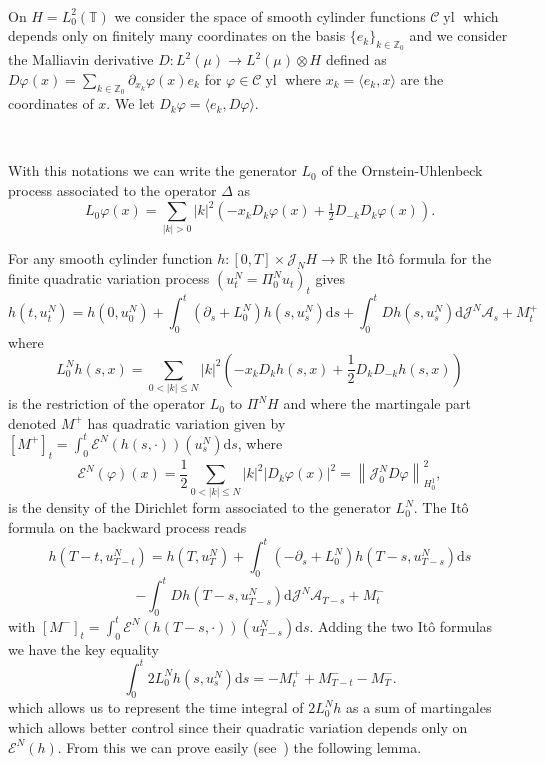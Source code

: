\documentclass[a4paper,11pt]{article}
\newcommand{\mathd}{\mathrm{d}}
\newcommand{\tmop}[1]{\ensuremath{\operatorname{#1}}}
\newcommand{\cyl}{\mathcal{C} \tmop{yl}}
\newcommand{\JJ}{\mathcal{J}}
\begin{document}
\

On $H = L^2_0 (\mathbb{T})$ we consider the space of smooth cylinder
functions $\cyl$ which depends only on finitely many coordinates on the basis
$\{e_k \}_{k \in \mathbb{Z}_0}$ and we consider the Malliavin derivative $D :
L^2 (\mu) \to L^2 (\mu) \otimes H$ defined as $D \varphi (x) = \sum_{k \in
\mathbb{Z}_0} \partial_{x_k} \varphi (x) e_k$ for $\varphi \in \cyl$ where
$x_k = \langle e_k, x \rangle$ are the coordinates of $x$. We let $D_k \varphi
= \langle e_k, D \varphi \rangle$.

\

With this notations we can write the generator $L_0$ of the
Ornstein-Uhlenbeck process associated to the operator $\Delta$ as
\begin{equation}
  \label{eq:generator-ou} L_0 \varphi (x) = \sum_{| k | > 0} |k|^2  \left( -
  x_k D_k \varphi (x) + \tfrac{1}{2} D_{- k} D_k \varphi (x) \right) .
\end{equation}


For any smooth cylinder function $h : [0, T] \times \JJ_N H \to \mathbb{R}$
the It{\^o} formula for the finite quadratic variation process $(u^N_t =
\Pi^N_0 u_t)_t$ gives
\[ h (t, u^N_t) = h (0, u^N_0) + \int_0^t (\partial_s + L^N_0) h (s, u^N_s)
   \mathd s + \int_0^t Dh (s, u^N_s) \mathd \JJ^N \mathcal{A}_s + M^+_t \]
where
\[ L^N_0 h (s, x) = \sum_{0 < |k| \le N} |k|^2  (- x_k D_k h (s, x) +
   \frac{1}{2} D_k D_{- k} h (s, x)) \]
is the restriction of the operator $L_0$ to $\Pi^N H$ and where the martingale
part denoted $M^+$ has quadratic variation given by $[M^+]_t = \int_0^t
\mathcal{E}^N (h (s, \cdot)) (u^N_s) \mathd s$, where
\[ \mathcal{E}^N (\varphi) (x) = \frac{1}{2}  \sum_{0 < |k| \le N} |k|^2  |D_k
   \varphi (x) |^2 = \left\| \JJ_0^N D \varphi \right\|_{H^1_0}^2, \]
is the density of the Dirichlet form associated to the generator $L_0^N$. The
It{\^o} formula on the backward process reads
\[ h (T - t, u^N_{T - t}) = h (T, u^N_T) + \int_0^t (- \partial_s + L^N_0) h
   (T - s, u^N_{T - s}) \mathd s \]
\[ - \int_0^t Dh (T - s, u^N_{T - s}) \mathd \JJ^N \mathcal{A}_{T - s} + M^-_t
\]
with $[M^-]_t = \int_0^t \mathcal{E}^N (h (T - s, \cdot)) (u^N_{T - s}) \mathd
s$. Adding the two It{\^o} formulas we have the key equality
\begin{equation}
  \label{eq:key-representation} \int_0^t 2 L_0^N h (s, u^N_s) \mathd s = -
  M^+_t + M^-_{T - t} - M^-_T .
\end{equation}
which allows us to represent the time integral of $2 L_0^N h$ as a sum of
martingales which allows better control since their quadratic variation
depends only on $\mathcal{E}^N (h)$. From this we can prove easily
(see~{\cite{gubinelli_regularization_2013}}) the following lemma.
\end{document}
